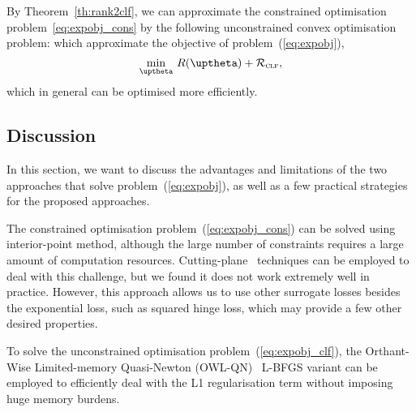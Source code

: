 By Theorem~\ref{th:rank2clf}, we can approximate the constrained optimisation problem~\ref{eq:expobj_cons}
by the following unconstrained convex optimisation problem:
which approximate the objective of problem~(\ref{eq:expobj}),
\begin{equation}
\label{eq:expobj_clf}
\min_{\uptheta} \, R(\uptheta) + \RCal_\textsc{clf},
\end{equation}
which in general can be optimised more efficiently.


\subsection{Discussion}

In this section, we want to discuss the advantages and limitations of the
two approaches that solve problem~(\ref{eq:expobj}),
as well as a few practical strategies for the proposed approaches.

The constrained optimisation problem~(\ref{eq:expobj_cons}) can be solved using interior-point method,
although the large number of constraints requires a large amount of computation resources.
Cutting-plane~\cite{avriel2003nonlinear} techniques can be employed to deal with this challenge,
but we found it does not work extremely well in practice.
However, this approach allows us to use other surrogate losses besides the exponential loss,
such as squared hinge loss, which may provide a few other desired properties. %

To solve the unconstrained optimisation problem~(\ref{eq:expobj_clf}),
the Orthant-Wise Limited-memory Quasi-Newton (OWL-QN)~\cite{andrew2007scalable} L-BFGS variant can be employed to
efficiently deal with the L1 regularisation term without imposing huge memory burdens.

